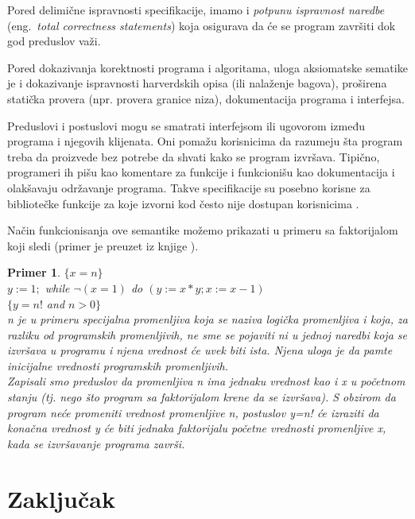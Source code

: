 \documentclass[a4paper]{article}
\newtheorem{primer}{Primer}[section]
\begin{document}
Pored delimične ispravnosti specifikacije, imamo i \textit {potpunu ispravnost naredbe } (eng.~{\em  total correctness statements}) koja osigurava da će se program završiti dok god preduslov važi.

Pored dokazivanja korektnosti programa i algoritama, uloga aksiomatske sematike je i dokazivanje ispravnosti harverdskih opisa (ili nalaženje bagova), proširena statička provera (npr. provera granice niza), dokumentacija programa i interfejsa.

Preduslovi i postuslovi mogu se smatrati interfejsom ili ugovorom između programa i njegovih klijenata. Oni pomažu korisnicima da razumeju šta program treba da proizvede bez potrebe da shvati kako se program izvršava. Tipično, programeri ih pišu kao komentare za funkcije i
funkcionišu kao dokumentacija i olakšavaju održavanje programa. Takve specifikacije su posebno
korisne za bibliotečke funkcije za koje izvorni kod često nije dostupan korisnicima \cite{adrian}.

Način funkcionisanja ove semantike možemo prikazati u primeru sa faktorijalom koji sledi (primer je preuzet iz knjige \cite{nielson} ). \\
\begin{primer}
$\{ x=n \} $ \\
$  y := 1; $
 while $ \neg(x=1) $  do $ (y := x*y; x := x-1) $\\
$ \{ y=n!$ and $ n > 0 \} $ \\

n je u primeru specijalna promenljiva koja se naziva logička promenljiva i koja, za razliku od programskih promenljivih, ne sme se pojaviti ni u jednoj naredbi koja se izvršava u programu i njena vrednost će uvek biti ista. Njena uloga je da pamte inicijalne vrednosti programskih promenljivih. \\
 Zapisali smo  preduslov da promenljiva n ima jednaku vrednost kao i x u početnom stanju (tj. nego što program sa faktorijalom krene da se izvršava). S obzirom da program neće promeniti vrednost promenljive n, postuslov y=n! će izraziti da konačna vrednost y  će biti jednaka faktorijalu početne vrednosti promenljive x, kada se izvršavanje programa završi. \\

\end{primer}

\section{Zaključak}
\label{sec:zakljucak}
\end{document}
